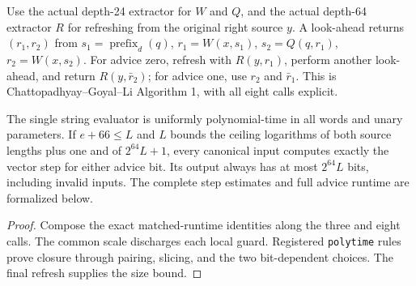 \begin{definition}
  \label{def:lowerbounds-algebraic-flipflop-program}
  \leanok
  Use the actual depth-24 extractor for $W$ and $Q$, and the actual
  depth-64 extractor $R$ for refreshing from the original right source $y$.
  A look-ahead returns $(r_1,r_2)$ from
  $s_1=\operatorname{prefix}_d(q)$, $r_1=W(x,s_1)$,
  $s_2=Q(q,r_1)$, $r_2=W(x,s_2)$.
  For advice zero, refresh with $R(y,r_1)$, perform another look-ahead,
  and return $R(y,\bar r_2)$; for advice one, use $r_2$ and $\bar r_1$.
  This is Chattopadhyay--Goyal--Li Algorithm 1, with all eight calls explicit.
\end{definition}

\begin{theorem}
  \label{thm:lowerbounds-algebraic-flipflop-program}
  \leanok
  The single string evaluator is uniformly polynomial-time in all words
  and unary parameters. If $e+66\le L$ and $L$ bounds the ceiling
  logarithms of both source lengths plus one and of $2^{64}L+1$, every
  canonical input computes exactly the vector step for either advice bit.
  Its output always has at most $2^{64}L$ bits, including invalid inputs.
  The complete step estimates and full advice runtime are formalized below.
\end{theorem}
\begin{proof}
  \leanok
  Compose the exact matched-runtime identities along the three and eight
  calls. The common scale discharges each local guard. Registered
  \texttt{polytime} rules prove closure through pairing, slicing, and
  the two bit-dependent choices. The final refresh supplies the size bound.
\end{proof}

